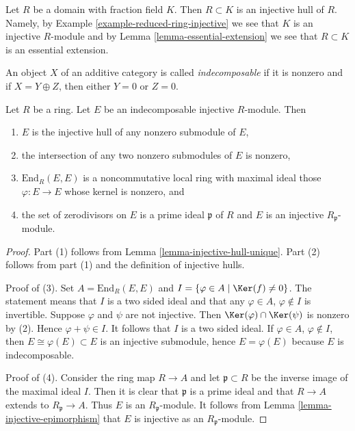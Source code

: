 \begin{example}
\label{example-injective-hull-domain}
Let $R$ be a domain with fraction field $K$. Then $R \subset K$ is an
injective hull of $R$. Namely, by
Example \ref{example-reduced-ring-injective} we see that $K$ is an injective
$R$-module and by Lemma \ref{lemma-essential-extension} we see that
$R \subset K$ is an essential extension.
\end{example}

\begin{definition}
\label{definition-indecomposable}
An object $X$ of an additive category is called {\it indecomposable}
if it is nonzero and if $X = Y \oplus Z$, then either $Y = 0$ or $Z = 0$.
\end{definition}

\begin{lemma}
\label{lemma-indecomposable-injective}
Let $R$ be a ring. Let $E$ be an indecomposable injective $R$-module.
Then
\begin{enumerate}
\item $E$ is the injective hull of any nonzero submodule of $E$,
\item the intersection of any two nonzero submodules of $E$ is nonzero,
\item $\text{End}_R(E, E)$ is a noncommutative local ring with maximal
ideal those $\varphi : E \to E$ whose kernel is nonzero, and
\item the set of zerodivisors on $E$ is a prime ideal $\mathfrak p$ of $R$
and $E$ is an injective $R_\mathfrak p$-module.
\end{enumerate}
\end{lemma}

\begin{proof}
Part (1) follows from Lemma \ref{lemma-injective-hull-unique}.
Part (2) follows from part (1) and the definition of injective hulls.

\medskip\noindent
Proof of (3). Set $A = \text{End}_R(E, E)$ and
$I = \{\varphi \in A \mid \Ker(f) \not = 0\}$.
The statement means that $I$ is a two sided ideal and
that any $\varphi \in A$, $\varphi \not \in I$ is invertible.
Suppose $\varphi$ and $\psi$ are not injective.
Then $\Ker(\varphi) \cap \Ker(\psi)$ is nonzero
by (2). Hence $\varphi + \psi \in I$. It follows that $I$
is a two sided ideal. If $\varphi \in A$, $\varphi \not \in I$,
then $E \cong \varphi(E) \subset E$ is an injective submodule,
hence $E = \varphi(E)$ because $E$ is indecomposable.

\medskip\noindent
Proof of (4). Consider the ring map $R \to A$ and let $\mathfrak p \subset R$
be the inverse image of the maximal ideal $I$. Then it is clear
that $\mathfrak p$ is a prime ideal and that $R \to A$ extends to
$R_\mathfrak p \to A$. Thus $E$ is an $R_\mathfrak p$-module.
It follows from Lemma \ref{lemma-injective-epimorphism} that $E$ is injective
as an $R_\mathfrak p$-module.
\end{proof}

